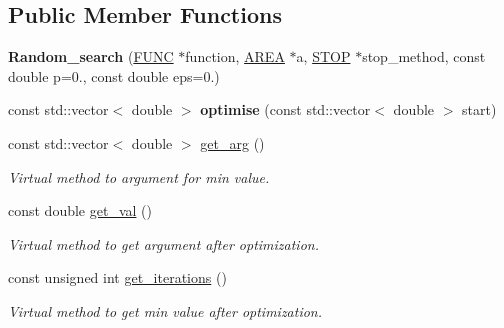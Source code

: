\subsection*{Public Member Functions}
\begin{DoxyCompactItemize}
\item 
\mbox{\label{class_random__search_a727a80d38d90bc60d388615fc36bf422}} 
{\bfseries Random\+\_\+search} (\hyperlink{class_f_u_n_c}{F\+U\+NC} $\ast$function, \hyperlink{class_a_r_e_a}{A\+R\+EA} $\ast$a, \hyperlink{class_s_t_o_p}{S\+T\+OP} $\ast$stop\+\_\+method, const double p=0., const double eps=0.)
\item 
\mbox{\label{class_random__search_a82bffda766b580ece0b5ec259e220fa6}} 
const std\+::vector$<$ double $>$ {\bfseries optimise} (const std\+::vector$<$ double $>$ start)
\item 
\mbox{\label{class_random__search_a1fef87ecbb840f70e4703383422ba3ec}} 
const std\+::vector$<$ double $>$ \hyperlink{class_random__search_a1fef87ecbb840f70e4703383422ba3ec}{get\+\_\+arg} ()
\begin{DoxyCompactList}\small\item\em Virtual method to argument for min value. \end{DoxyCompactList}\item 
\mbox{\label{class_random__search_a7aa1969de56bb81cfc6f0ac5d81080e9}} 
const double \hyperlink{class_random__search_a7aa1969de56bb81cfc6f0ac5d81080e9}{get\+\_\+val} ()
\begin{DoxyCompactList}\small\item\em Virtual method to get argument after optimization. \end{DoxyCompactList}\item 
\mbox{\label{class_random__search_af05aca1c09c966e863fdac963ebb8641}} 
const unsigned int \hyperlink{class_random__search_af05aca1c09c966e863fdac963ebb8641}{get\+\_\+iterations} ()
\begin{DoxyCompactList}\small\item\em Virtual method to get min value after optimization. \end{DoxyCompactList}\end{DoxyCompactItemize}
